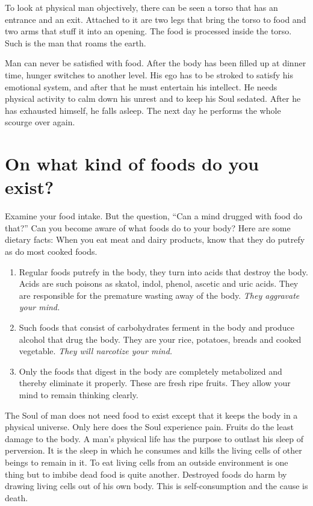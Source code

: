 \documentclass[12pt,letterpaper]{article}
\begin{document}
To look at physical man objectively, there can be seen a torso that
has an entrance and an exit. Attached to it are two legs that bring
the torso to food and two arms that stuff it into an opening. The food
is processed inside the torso. Such is the man that roams the earth.

Man can never be satisfied with food. After the body has been filled
up at dinner time, hunger switches to another level. His ego has to be
stroked to satisfy his emotional system, and after that he must
entertain his intellect.  He needs physical activity to calm down his
unrest and to keep his Soul sedated. After he has exhausted himself,
he falls asleep. The next day he performs the whole scourge over
again.





\section{On what kind of foods do you exist?}

Examine your food intake. But the question, ``Can a mind drugged with
food do that?'' Can you become aware of what foods do to your body? 
Here are some dietary facts: When you eat meat and dairy products,
know that they do putrefy as do most cooked foods.
\begin{enumerate}
\item Regular foods putrefy in the body, they turn into acids that
destroy the body. Acids are such poisons as skatol, indol, phenol,
ascetic and uric acids. They are responsible for the premature wasting
away of the body. \emph{They aggravate your mind.}
  
\item Such foods that consist of carbohydrates ferment in the body and
produce alcohol that drug the body. They are your rice, potatoes,
breads and cooked vegetable. \emph{They will narcotize your mind.}
  
\item Only the foods that digest in the body are completely
metabolized and thereby eliminate it properly. These are fresh ripe
fruits. They allow your mind to remain thinking clearly.
\end{enumerate} The Soul of man does not need food to exist except
that it keeps the body in a physical universe. Only here does the Soul
experience pain. Fruits do the least damage to the body. A man's
physical life has the purpose to outlast his sleep of perversion. It
is the sleep in which he consumes and kills the living cells of other
beings to remain in it. To eat living cells from an outside
environment is one thing but to imbibe dead food is quite
another. Destroyed foods do harm by drawing living cells out of his
own body. This is self-consumption and the cause is death.
\end{document}
